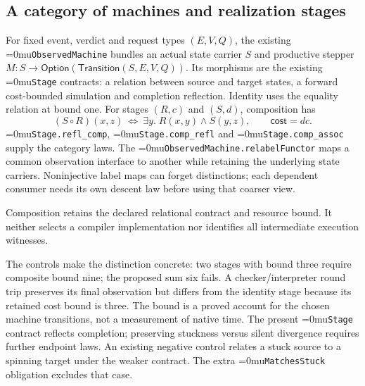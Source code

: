 \documentclass[11pt,a4paper]{article}
\newcommand{\name}[1]{\textup{\Urlmuskip=0mu\relax\nolinkurl{#1}}}
\newcommand{\diagramcaption}[1]{\par{\small\color{ink}#1\par}\medskip}
\begin{document}
\subsection{A category of machines and realization stages}

For fixed event, verdict and request types $(E,V,Q)$, the existing
\name{ObservedMachine} bundles an actual state carrier $S$ and productive
stepper $M:S\to\mathsf{Option}(\mathsf{Transition}(S,E,V,Q))$.
Its morphisms are the existing \name{Stage} contracts: a relation between
source and target states, a forward cost-bounded simulation and completion
reflection. Identity uses the equality relation at bound one. For stages
$(R,c)$ and $(S,d)$, composition has
\[
 (S\circ R)(x,z)\ \Longleftrightarrow\
       \exists y.\;R(x,y)\wedge S(y,z),
 \qquad \mathsf{cost}=dc.
\]
\name{Stage.refl_comp}, \name{Stage.comp_refl} and
\name{Stage.comp_assoc} supply the category laws. The
\name{ObservedMachine.relabelFunctor} maps a common observation interface
to another while retaining the underlying state carriers. Noninjective label
maps can forget distinctions; each dependent consumer needs its own descent
law before using that coarser view.

\begin{center}
\end{center}
\diagramcaption{Composition retains the declared relational contract and
resource bound. It neither selects a compiler implementation nor identifies
all intermediate execution witnesses.}

The controls make the distinction concrete: two stages with bound three
require composite bound nine; the proposed sum six fails. A checker/interpreter
round trip preserves its final observation but differs from the identity
stage because its retained cost bound is three. The bound is a proved account
for the chosen machine transitions, not a measurement of native time.
The present \name{Stage} contract reflects completion; preserving stuckness
versus silent divergence requires further endpoint laws. An existing negative
control relates a stuck source to a spinning target under the weaker contract.
The extra \name{MatchesStuck} obligation excludes that case.
\end{document}
